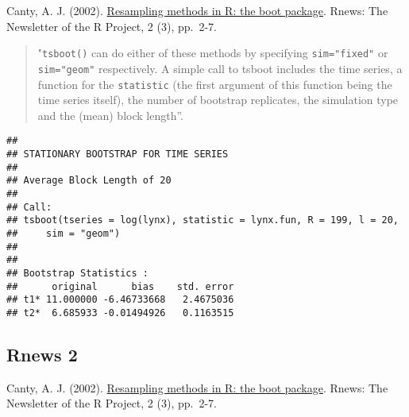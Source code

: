 \documentclass[
]{book}
\newenvironment{Shaded}{\begin{snugshade}}{\end{snugshade}}
\newcommand{\CommentTok}[1]{\textcolor[rgb]{0.56,0.35,0.01}{\textit{#1}}}
\newcommand{\ControlFlowTok}[1]{\textcolor[rgb]{0.13,0.29,0.53}{\textbf{#1}}}
\newcommand{\DataTypeTok}[1]{\textcolor[rgb]{0.13,0.29,0.53}{#1}}
\newcommand{\DecValTok}[1]{\textcolor[rgb]{0.00,0.00,0.81}{#1}}
\newcommand{\KeywordTok}[1]{\textcolor[rgb]{0.13,0.29,0.53}{\textbf{#1}}}
\newcommand{\NormalTok}[1]{#1}
\newcommand{\OperatorTok}[1]{\textcolor[rgb]{0.81,0.36,0.00}{\textbf{#1}}}
\newcommand{\StringTok}[1]{\textcolor[rgb]{0.31,0.60,0.02}{#1}}
\theoremstyle{definition}
\theoremstyle{definition}
\theoremstyle{definition}
\theoremstyle{remark}
\begin{document}
Canty, A. J. (2002). \href{http://cran.fhcrc.org/doc/Rnews/Rnews_2002-3.pdf}{Resampling methods in R: the boot package}. Rnews: The Newsletter of the R Project, 2 (3), pp.~2-7.

\begin{quote}
"\texttt{tsboot()} can do either of these methods
by specifying \texttt{sim="fixed"} or \texttt{sim="geom"} respectively.
A simple call to tsboot includes the time
series, a function for the \texttt{statistic} (the first argument
of this function being the time series itself), the number
of bootstrap replicates, the simulation type and
the (mean) block length''.
\end{quote}

\begin{Shaded}
\end{Shaded}

\begin{verbatim}
## 
## STATIONARY BOOTSTRAP FOR TIME SERIES
## 
## Average Block Length of 20 
## 
## Call:
## tsboot(tseries = log(lynx), statistic = lynx.fun, R = 199, l = 20, 
##     sim = "geom")
## 
## 
## Bootstrap Statistics :
##      original      bias    std. error
## t1* 11.000000 -6.46733668   2.4675036
## t2*  6.685933 -0.01494926   0.1163515
\end{verbatim}

\hypertarget{rnews-2}{%
\subsection{Rnews 2}\label{rnews-2}}

Canty, A. J. (2002). \href{http://cran.fhcrc.org/doc/Rnews/Rnews_2002-3.pdf}{Resampling methods in R: the boot package}. Rnews: The Newsletter of the R Project, 2 (3), pp.~2-7.
\end{document}
